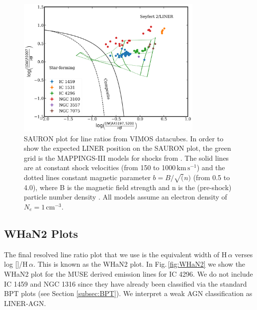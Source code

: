 		\begin{figure}
			\centering
			\includegraphics[width=0.8\textwidth]{chapter5/SAURON.png}
			\caption[An alternative diagnostic plot]{SAURON plot for line ratios from VIMOS datacubes. In order to show the expected LINER position on the SAURON plot, the green grid is the MAPPINGS-III models for shocks from \citet{Allen2008}. The solid lines are at constant shock velocities (from 150 to 1000\,$\mathrm{km\,s^{-1}}$) and the dotted lines constant magnetic parameter $b = B/\sqrt(n)$ (from 0.5 to 4.0), where B is the magnetic field strength and n is the (pre-shock) particle number density \citep{Dopita1996}. All models assume an electron density of $N_e = 1\,\mathrm{cm^{-3}}$.}
			\label{fig:SAURON}
		\end{figure}


	\subsection{WHaN2 Plots}
		\label{subsec:WHaN2}
		The final resolved line ratio plot that we use is the equivalent width of H\,$\alpha$ verses log []/H\,$\alpha$. This is known as the WHaN2 plot. In Fig.\,\ref{fig:WHaN2} we show the WHaN2 plot for the MUSE derived emission lines for IC 4296. We do not include IC 1459 and NGC 1316 since they have already been classified via the standard BPT plots (see Section \ref{subsec:BPT}). We interpret a weak AGN classification as LINER-AGN.

